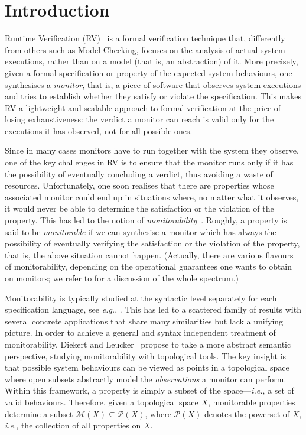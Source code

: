 \documentclass{lmcs}
\def\eg{{\em e.g.}}
\def\ie{{\em i.e.}}
\begin{document}

\section{Introduction}

Runtime Verification (RV)~\cite{LeuckerS09,BartocciFFR18} 
is a formal verification technique that, differently from others such as Model Checking,
focuses on the analysis of actual system executions, rather than on a model (that is, an abstraction) of it.
% 
More precisely, 
given a formal specification or property of the expected system behaviours, 
one synthesises a \emph{monitor}, that is, a piece of software that observes system executions and tries to establish whether they satisfy or violate the specification. 
% 
This makes RV a lightweight and scalable approach to formal verification at the price of losing exhaustiveness: 
the verdict a monitor can reach is valid only for the executions it has observed, not for all possible ones. 

Since in many cases monitors have to run together with the system they observe, 
one of the key challenges in RV is to ensure that the monitor runs only if it has the possibility of eventually concluding a verdict, thus avoiding a waste of resources. 
% 
Unfortunately, one soon realises that there are properties whose associated monitor could end up in situations where, no matter what it observes, it would never be able to determine the satisfaction or the violation of the property. 
% 
This has led to the notion of \emph{monitorability}~\cite{PnueliZ06}.
Roughly, a property is said to be \emph{monitorable} 
if we can synthesise a monitor which has always the possibility of eventually verifying the satisfaction or the violation of the property, that is, 
the above situation cannot happen. (Actually, there are various flavours of monitorability, depending on the operational guarantees one wants to obtain on monitors; we refer to \cite{AcetoAFIL21ssm} for a discussion of the whole spectrum.) 

Monitorability is typically studied at the syntactic level separately for each specification language, see \eg, \cite{BauerLS11,FrancalanzaAI17,AmaraBFF25}. 
This has led to a scattered family of results with several concrete applications that share many similarities but lack a unifying picture.
% 
In order to achieve a general and syntax independent treatment of monitorability,
Diekert and Leucker~\cite{dieker2014} propose to take a more abstract semantic perspective, studying monitorability with topological tools. 
The key insight is that possible system behaviours can be viewed as points in a topological space where open subsets abstractly model the \emph{observations} a monitor can perform. 
Within this framework, a property is simply a subset of the space—\ie, a set of valid behaviours.
Therefore, given a topological space $X$, 
monitorable properties determine a subset $\mathcal{M}(X) \subseteq \mathcal{P}(X)$, where $\mathcal{P}(X)$ denotes the powerset of $X$, \ie, the collection of all properties on $X$. 
\end{document}
